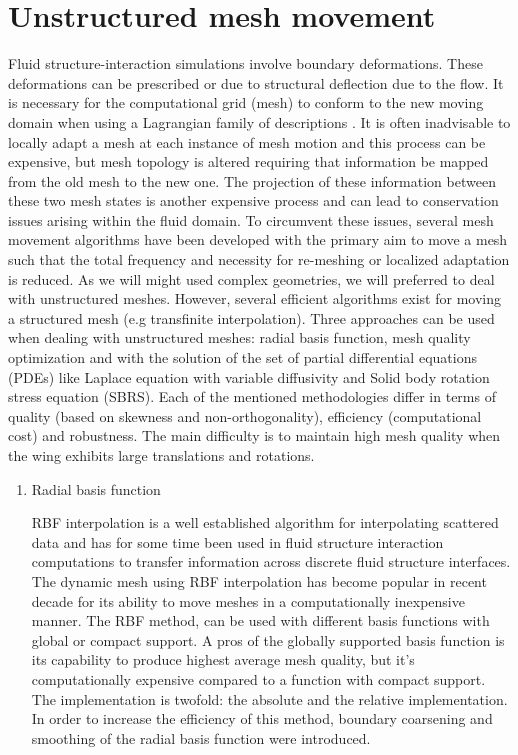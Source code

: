 \documentclass[10pt,a4paper,twoside]{article}
\begin{document}
\section{Unstructured mesh movement}
Fluid structure-interaction simulations involve boundary deformations. These deformations can be prescribed or due to structural deflection due to the flow. It is necessary for the computational grid (mesh) to conform to the new moving domain when using a Lagrangian family of descriptions \cite{bogaers2010reduced}. It is often inadvisable to locally adapt a mesh at each instance of mesh motion and this process can be expensive, but mesh topology is altered requiring that information be mapped from the old mesh to the new one. The projection of these information between these two mesh states is another expensive process and can lead to conservation issues arising within the fluid domain. To circumvent these issues, several mesh movement algorithms have been developed with the primary aim to move a mesh such that the total frequency and necessity for re-meshing or localized adaptation is reduced. As we will might used complex geometries, we will preferred to deal with unstructured meshes. However, several efficient algorithms exist for moving a structured mesh (e.g transfinite interpolation). Three approaches can be used when dealing with unstructured meshes: radial basis function, mesh quality optimization and with the solution of the set of partial differential equations (PDEs) like Laplace equation with variable diffusivity and Solid body rotation stress equation (SBRS). Each of the mentioned methodologies differ in terms of quality (based on skewness and non-orthogonality), efficiency (computational cost) and robustness. The main difficulty is to maintain high mesh quality when the wing exhibits large translations and rotations.
\begin{enumerate}
	\item Radial basis function
	
	RBF interpolation is a well established algorithm for interpolating scattered data and has for some time been used in fluid structure interaction computations to transfer information across discrete fluid structure interfaces. The dynamic mesh using RBF interpolation has become popular in recent decade for its ability to move meshes in a computationally inexpensive manner. The RBF method, can be used with different basis functions with global or compact support. A pros of the globally supported basis function is its capability to produce highest average mesh quality, but it's computationally expensive compared to a function with compact support. The implementation is twofold: the absolute and the relative implementation. In order
	to increase the efficiency of this method,
	boundary coarsening and smoothing of the radial basis function were introduced. 
\end{enumerate}
\end{document}
